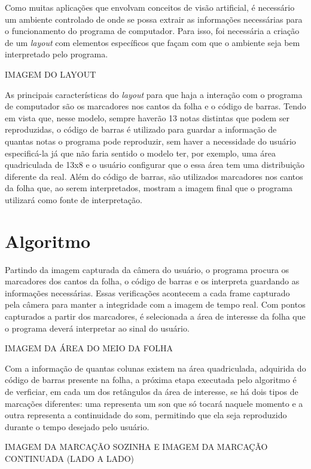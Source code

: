 \documentclass[12pt]{report}
\begin{document}
Como muitas aplicações que envolvam conceitos de visão artificial, é necessário um ambiente controlado de onde se possa extrair as informações necessárias para o funcionamento do programa de computador. Para isso, foi necessária a criação de um {\it layout} com elementos específicos que façam com que o ambiente seja bem interpretado pelo programa.

IMAGEM DO LAYOUT

As principais características do {\it layout} para que haja a interação com o programa de computador são os  marcadores nos cantos da folha e o código de barras. Tendo em vista que, nesse modelo, sempre haverão 13 notas distintas que podem ser reproduzidas, o código de barras é utilizado para guardar a informação de quantas notas o programa pode reproduzir, sem haver a necessidade do usuário especificá-la já que não faria sentido o modelo ter, por exemplo, uma área quadriculada de 13x8 e o usuário configurar que o essa área tem uma distribuição diferente da real. Além do código de barras, são utilizados marcadores nos cantos da folha que, ao serem interpretados, mostram a imagem final que o programa utilizará como fonte de interpretação.

\section{Algoritmo}

Partindo da imagem capturada da câmera do usuário, o programa procura os marcadores dos cantos da folha, o código de barras e os interpreta guardando as informações necessárias. Essas verificações acontecem a cada frame capturado pela câmera para manter a integridade com a imagem de tempo real.
Com pontos capturados a partir dos marcadores, é selecionada a área de interesse da folha que o programa deverá interpretar ao sinal do usuário.

IMAGEM DA ÁREA DO MEIO DA FOLHA

Com a informação de quantas colunas existem na área quadriculada, adquirida do código de barras presente na folha, a próxima etapa executada pelo algoritmo é de verficiar, em cada um dos retângulos da área de interesse, se há dois tipos de marcações diferentes: uma representa um son que só tocará naquele momento e a outra representa a continuidade do som, permitindo que ela seja reproduzido durante o tempo desejado pelo usuário.

IMAGEM DA MARCAÇÃO SOZINHA E IMAGEM DA MARCAÇÃO CONTINUADA (LADO A LADO)
\end{document}
